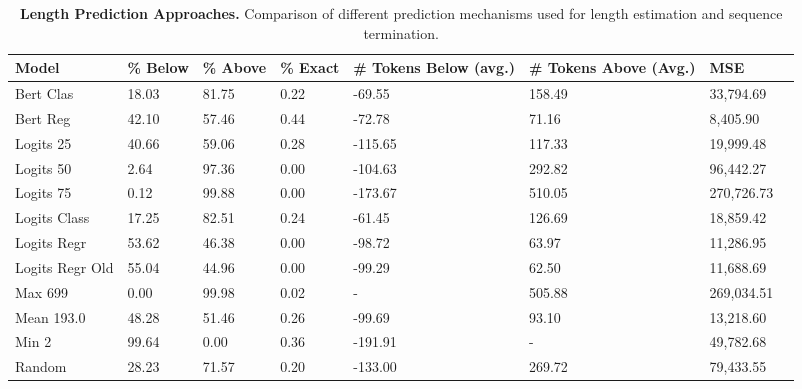 \begin{table*}[htbp]
\centering
\caption{\textbf{Length Prediction Approaches.} Comparison of different prediction mechanisms used for length estimation and sequence termination.}
\label{tab:model_performance}
\begin{tabularx}{\linewidth}{l|YYYYYYY}
\toprule
\textbf{Model} & \textbf{\% Below} & \textbf{\% Above} & \textbf{\% Exact} & \textbf{\# Tokens Below (avg.)} & \textbf{\# Tokens Above (Avg.)} & \textbf{MSE} \\ \midrule
Bert Clas & 18.03 & 81.75 & 0.22 & -69.55 & 158.49 & 33,794.69 \\
Bert Reg & 42.10 & 57.46 & 0.44 & -72.78 & 71.16 & 8,405.90 \\
Logits 25 & 40.66 & 59.06 & 0.28 & -115.65 & 117.33 & 19,999.48 \\
Logits 50 & 2.64 & 97.36 & 0.00 & -104.63 & 292.82 & 96,442.27 \\
Logits 75 & 0.12 & 99.88 & 0.00 & -173.67 & 510.05 & 270,726.73 \\
Logits Class & 17.25 & 82.51 & 0.24 & -61.45 & 126.69 & 18,859.42 \\
Logits Regr & 53.62 & 46.38 & 0.00 & -98.72 & 63.97 & 11,286.95 \\
Logits Regr Old & 55.04 & 44.96 & 0.00 & -99.29 & 62.50 & 11,688.69 \\
Max 699 & 0.00 & 99.98 & 0.02 & - & 505.88 & 269,034.51 \\
Mean 193.0 & 48.28 & 51.46 & 0.26 & -99.69 & 93.10 & 13,218.60 \\
Min 2 & 99.64 & 0.00 & 0.36 & -191.91 & - & 49,782.68 \\
Random & 28.23 & 71.57 & 0.20 & -133.00 & 269.72 & 79,433.55 \\
\bottomrule
\end{tabularx}
\end{table*}